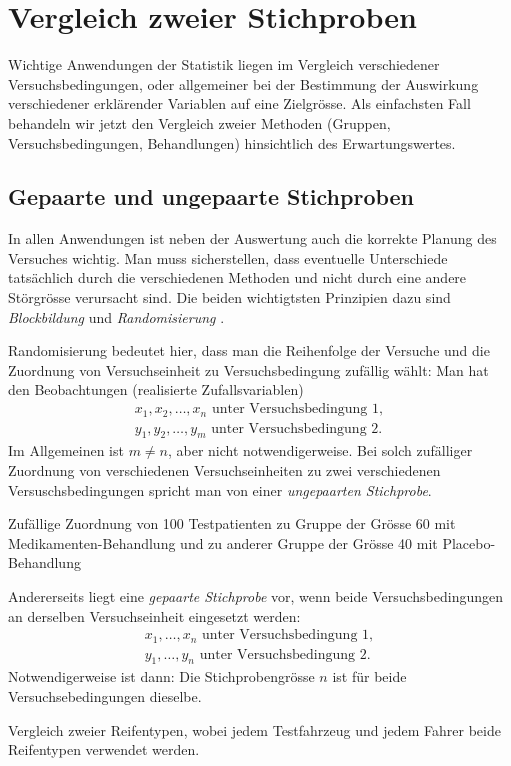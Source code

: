 \chapter{Vergleich zweier Stichproben}
\label{kap11}
Wichtige Anwendungen der Statistik liegen im Vergleich verschiedener Versuchsbedingungen, oder allgemeiner bei der Bestimmung der Auswirkung verschiedener erklärender Variablen auf eine Zielgrösse. Als einfachsten Fall behandeln wir jetzt den Vergleich zweier Methoden (Gruppen, Versuchsbedingungen, Behandlungen) hinsichtlich des Erwartungswertes.
\section{Gepaarte und ungepaarte Stichproben}
In allen Anwendungen ist neben der Auswertung auch die korrekte Planung des Versuches wichtig. Man muss sicherstellen, dass eventuelle Unterschiede tatsächlich durch die verschiedenen Methoden und nicht durch eine andere Störgrösse verursacht sind. Die beiden wichtigtsten Prinzipien dazu sind \emph{Blockbildung} und \emph{Randomisierung}
.

Randomisierung bedeutet hier, dass man die Reihenfolge der Versuche und die Zuordnung von Versuchseinheit zu Versuchsbedingung zufällig wählt: Man hat den Beobachtungen (realisierte Zufallsvariablen)
\begin{gather*}
	x_1,x_2,\ldots,x_n\text{ unter Versuchsbedingung 1},\\
	y_1,y_2,\ldots,y_m\text{ unter Versuchsbedingung 2}.
\end{gather*}
Im Allgemeinen ist $m\neq n$, aber nicht notwendigerweise. Bei solch zufälliger Zuordnung von verschiedenen Versuchseinheiten zu zwei verschiedenen Versuschsbedingungen spricht man von einer \emph{ungepaarten Stichprobe}.
\begin{bspl}
	Zufällige Zuordnung von 100 Testpatienten zu Gruppe der Grösse 60 mit Medikamenten-Behandlung und zu anderer Gruppe der Grösse 40 mit Placebo-Behandlung
\end{bspl}
Andererseits liegt eine \emph{gepaarte Stichprobe} vor, wenn beide Versuchsbedingungen an derselben Versuchseinheit eingesetzt werden:
\begin{gather*}
	x_1,\ldots,x_n\text{ unter Versuchsbedingung 1},\\
	y_1,\ldots,y_n\text{ unter Versuchsbedingung 2}.
\end{gather*}
Notwendigerweise ist dann: Die Stichprobengrösse $n$ ist für beide Versuchsebedingungen dieselbe.
\begin{bspl}
	Vergleich zweier Reifentypen, wobei jedem Testfahrzeug und jedem Fahrer beide Reifentypen verwendet werden.
\end{bspl}
